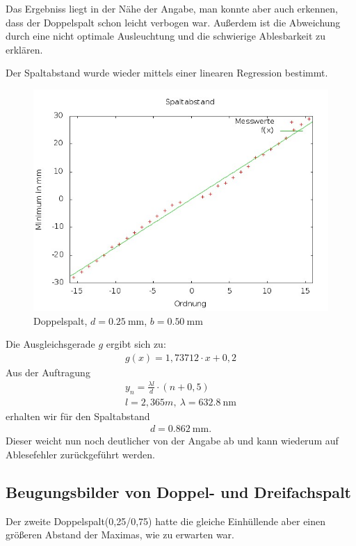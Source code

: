 \documentclass[ngerman, parskip*]{scrartcl}
\begin{document}
Das Ergebniss liegt in der Nähe der Angabe, man konnte aber auch erkennen, dass der Doppelspalt schon leicht verbogen war. Außerdem ist die Abweichung durch eine nicht optimale Ausleuchtung und die schwierige Ablesbarkeit zu erklären.

Der Spaltabstand wurde wieder mittels einer linearen Regression bestimmt.
\begin{figure}
  \centering
  \includegraphics[width=\textwidth,natwidth=2560,natheight=1920]{Diagramme/doppel1.jpg}
  \caption{Doppelspalt, $d = \SI{0,25}{\mm}$, $b = \SI{0,50}{\mm}$}
\end{figure}
Die Ausgleichsgerade $g$ ergibt sich zu:
\begin{align*}
g(x)=1,73712\cdot x+0,2
\end{align*}
Aus der Auftragung
\begin{align*}
y_n=\frac{\lambda l}{d}\cdot (n+0,5)\\
l=2,365m,\ \lambda=\SI{632,8}{\nano\m}
\end{align*}
erhalten wir für den Spaltabstand 
\begin{align*}
d=\SI{0,862}{\milli\m}.
\end{align*}
Dieser weicht nun noch deutlicher von der Angabe ab und kann wiederum auf Ablesefehler zurückgeführt werden.
\subsection{Beugungsbilder von Doppel- und Dreifachspalt}
Der zweite Doppelspalt(0,25/0,75) hatte die gleiche Einhüllende aber einen größeren Abstand der Maximas, wie zu erwarten war.
\end{document}
